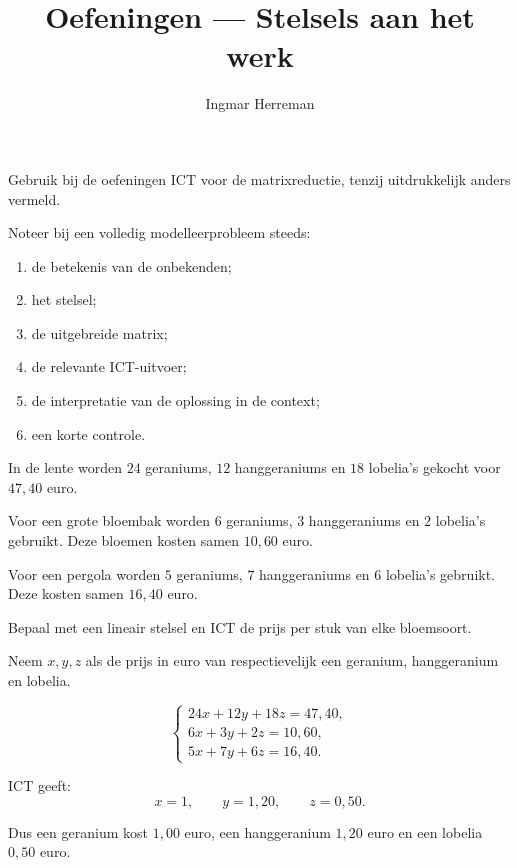 \documentclass{ximera}
\title{Oefeningen — Stelsels aan het werk}
\author{Ingmar Herreman}
\begin{document}





\maketitle

\FVDbeginExercises

\begin{opmerking}
Gebruik bij de oefeningen ICT voor de matrixreductie, tenzij uitdrukkelijk
anders vermeld.

Noteer bij een volledig modelleerprobleem steeds:
\begin{enumerate}
  \item de betekenis van de onbekenden;
  \item het stelsel;
  \item de uitgebreide matrix;
  \item de relevante ICT-uitvoer;
  \item de interpretatie van de oplossing in de context;
  \item een korte controle.
\end{enumerate}
\end{opmerking}




\begin{oefening}[Bloemenprijzen]{\oefB\ESS}

In de lente worden \(24\) geraniums, \(12\) hanggeraniums en \(18\)
lobelia's gekocht voor \(47{,}40\) euro.

Voor een grote bloembak worden \(6\) geraniums, \(3\) hanggeraniums en
\(2\) lobelia's gebruikt. Deze bloemen kosten samen \(10{,}60\) euro.

Voor een pergola worden \(5\) geraniums, \(7\) hanggeraniums en \(6\)
lobelia's gebruikt. Deze kosten samen \(16{,}40\) euro.

Bepaal met een lineair stelsel en ICT de prijs per stuk van elke bloemsoort.

\begin{oplossing}
Neem \(x,y,z\) als de prijs in euro van respectievelijk een geranium,
hanggeranium en lobelia.

\[
\begin{cases}
24x+12y+18z=47{,}40,\\
6x+3y+2z=10{,}60,\\
5x+7y+6z=16{,}40.
\end{cases}
\]

ICT geeft:
\[
x=1,\qquad y=1{,}20,\qquad z=0{,}50.
\]

Dus een geranium kost \(1{,}00\) euro, een hanggeranium \(1{,}20\) euro
en een lobelia \(0{,}50\) euro.
\end{oplossing}
\end{oefening}
\end{document}
